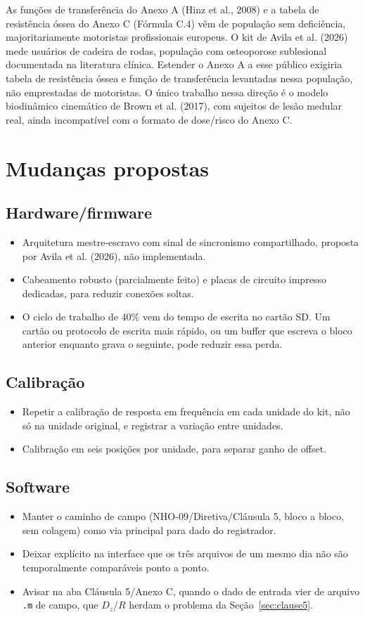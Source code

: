\documentclass[11pt,a4paper]{article}
\newcommand{\code}[1]{\texttt{\small #1}}
\begin{document}
As funções de transferência do Anexo A (Hinz et al., 2008) e a tabela de
resistência óssea do Anexo C (Fórmula C.4) vêm de população sem
deficiência, majoritariamente motoristas profissionais europeus. O kit de
Avila et al. (2026) mede usuários de cadeira de rodas, população com
osteoporose sublesional documentada na literatura clínica. Estender o
Anexo A a esse público exigiria tabela de resistência óssea e função de
transferência levantadas nessa população, não emprestadas de motoristas.
O único trabalho nessa direção é o modelo biodinâmico cinemático de Brown
et al. (2017), com sujeitos de lesão medular real, ainda incompatível com
o formato de dose/risco do Anexo C.

\section{Mudanças propostas}

\subsection{Hardware/firmware}
\begin{itemize}
\item Arquitetura mestre-escravo com sinal de sincronismo compartilhado,
proposta por Avila et al. (2026), não implementada.
\item Cabeamento robusto (parcialmente feito) e placas de circuito
impresso dedicadas, para reduzir conexões soltas.
\item O ciclo de trabalho de 40\% vem do tempo de escrita no cartão SD.
Um cartão ou protocolo de escrita mais rápido, ou um buffer que escreva
o bloco anterior enquanto grava o seguinte, pode reduzir essa perda.
\end{itemize}

\subsection{Calibração}
\begin{itemize}
\item Repetir a calibração de resposta em frequência em cada unidade do
kit, não só na unidade original, e registrar a variação entre unidades.
\item Calibração em seis posições por unidade, para separar ganho de
offset.
\end{itemize}

\subsection{Software}
\begin{itemize}
\item Manter o caminho de campo (NHO-09/Diretiva/Cláusula 5, bloco a
bloco, sem colagem) como via principal para dado do registrador.
\item Deixar explícito na interface que os três arquivos de um mesmo dia
não são temporalmente comparáveis ponto a ponto.
\item Avisar na aba Cláusula 5/Anexo C, quando o dado de entrada vier de
arquivo \code{.m} de campo, que $D_z$/$R$ herdam o problema da
Seção~\ref{sec:clause5}.
\end{itemize}
\end{document}
